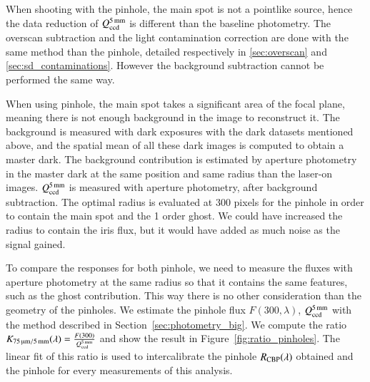 When shooting with the \bpinhole pinhole, the main spot is not a pointlike source, hence the data reduction of $Q_{\mathrm{ccd}}^{\SI{5}{\milli\meter}}$ is different than the baseline photometry. The overscan subtraction and the light contamination correction are done with the same method than the \spinhole pinhole, detailed respectively in \ref{sec:overscan} and \ref{sec:sd_contaminations}. However the background subtraction cannot be performed the same way. 

When using \bpinhole pinhole, the main spot takes a significant area of the focal plane, meaning there is not enough background in the image to reconstruct it. The background is measured with dark exposures with the dark datasets mentioned above, and the spatial mean of all these dark images is computed to obtain a master dark. The background contribution is estimated by aperture photometry in the master dark at the same position and same radius than the laser-on images. $Q_{\mathrm{ccd}}^{\SI{5}{\milli\meter}}$ is measured with aperture photometry, after background subtraction. The optimal radius is evaluated at 300 pixels for the \bpinhole pinhole in order to contain the main spot and the 1 order ghost. We could have increased the radius to contain the iris flux, but it would have added as much noise as the signal gained. 

To compare the \SD responses for both pinhole, we need to measure the fluxes with aperture photometry at the same radius so that it contains the same features, such as the ghost contribution. This way there is no other consideration than the geometry of the pinholes. We estimate the \spinhole pinhole flux $F(300, \lambda)$, $Q_{\mathrm{ccd}}^{\SI{5}{\milli\meter}}$ with the method described in Section~\ref{sec:photometry_big}. We compute the ratio $K_\mathrm{\SI{75}{\micro\meter}/\SI{5}{\milli\meter}}(\lambda)=\frac{F(300)}{Q_{\mathrm{ccd}}^{\SI{5}{\milli\meter}}}$ and show the result in Figure~\ref{fig:ratio_pinholes}. The linear fit of this ratio is used to intercalibrate the \bpinhole pinhole $R_{\mathrm{CBP}}(\lambda)$ obtained and the \spinhole pinhole \SD for every measurements of this analysis.

